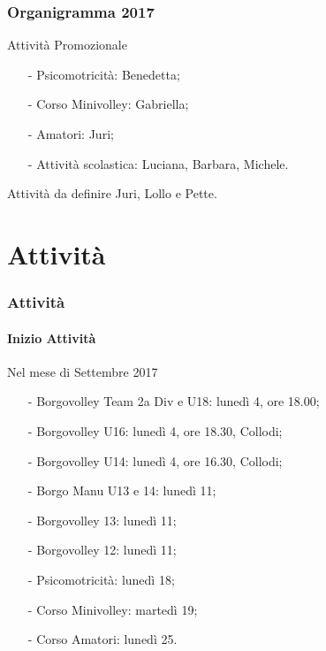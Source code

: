 \documentclass{beamer}
\begin{document}
\begin{frame}
\frametitle{Organigramma 2017}
\begin{block}{Attività Promozionale}
\begin{itemize}
\item[-]Psicomotricità: Benedetta;
\item[-]Corso Minivolley: Gabriella;
\item[-]Amatori: Juri;
\item[-]Attività scolastica: Luciana, Barbara, Michele.
\end{itemize}
\end{block}

\begin{block}{Attività da definire}
Juri, Lollo e Pette.
\end{block}
\end{frame}


\section{Attività}


\begin{frame}
\frametitle{Attività}
\framesubtitle{Inizio Attività}
\begin{block}{Nel mese di Settembre 2017}
\begin{itemize}
\item[-]Borgovolley Team 2a Div e U18: lunedì 4, ore 18.00;
\item[-]Borgovolley U16: lunedì 4, ore 18.30, Collodi;
\item[-]Borgovolley U14: lunedì 4, ore 16.30, Collodi;
\item[-]Borgo Manu U13 e 14: lunedì 11;
\item[-]Borgovolley 13: lunedì 11;
\item[-]Borgovolley 12: lunedì 11;
\item[-]Psicomotricità: lunedì 18;
\item[-]Corso Minivolley: martedì 19;
\item[-]Corso Amatori: lunedì 25.
\end{itemize}
\end{block}
\end{frame}
\end{document}
